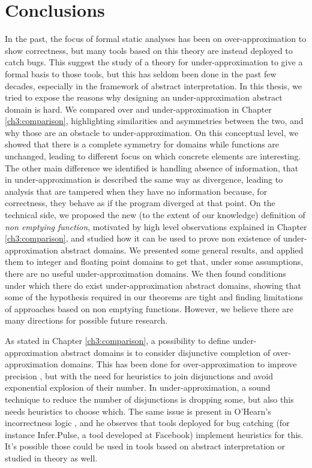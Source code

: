 \chapter{Conclusions}\label{ch:conclusions}
In the past, the focus of formal static analyses has been on over-approximation to show correctness, but many tools based on this theory are instead deployed to catch bugs. This suggest the study of a theory for under-approximation to give a formal basis to those tools, but this has seldom been done in the past few decades, especially in the framework of abstract interpretation.
In this thesis, we tried to expose the reasons why designing an under-approximation abstract domain is hard. We compared over and under-approximation in Chapter \ref{ch3:comparison}, highlighting similarities and asymmetries between the two, and why those are an obstacle to under-approximation. On this conceptual level, we showed that there is a complete symmetry for domains while functions are unchanged, leading to different focus on which concrete elements are interesting. The other main difference we identified is handling absence of information, that in under-approximation is described the same way as divergence, leading to analysis that are tampered when they have no information because, for correctness, they behave as if the program diverged at that point.
On the technical side, we proposed the new (to the extent of our knowledge) definition of \emph{non emptying function}, motivated by high level observations explained in Chapter \ref{ch3:comparison}, and studied how it can be used to prove non existence of under-approximation abstract domains. We presented some general results, and applied them to integer and floating point domains to get that, under some assumptions, there are no useful under-approximation domains. We then found conditions under which there do exist under-approximation abstract domains, showing that some of the hypothesis required in our theorems are tight and finding limitations of approaches based on non emptying functions.
However, we believe there are many directions for possible future research.

As stated in Chapter \ref{ch3:comparison}, a possibility to define under-approximation abstract domains is to consider disjunctive completion of over-approximation domains. This has been done for over-approximation to improve precision \cite{file-disjunctive-completion}, but with the need for heuristics to join disjunctions and avoid exponential explosion of their number.
In under-approximation, a sound technique to reduce the number of disjunctions is dropping some, but also this needs heuristics to choose which. The same issue is present in O'Hearn's incorrectness logic \cite{ohearn-incorrectness-logic}, and he observes that tools deployed for bug catching (for instance Infer.Pulse, a tool developed at Facebook) implement heuristics for this. It's possible those could be used in tools based on abstract interpretation or studied in theory as well.

